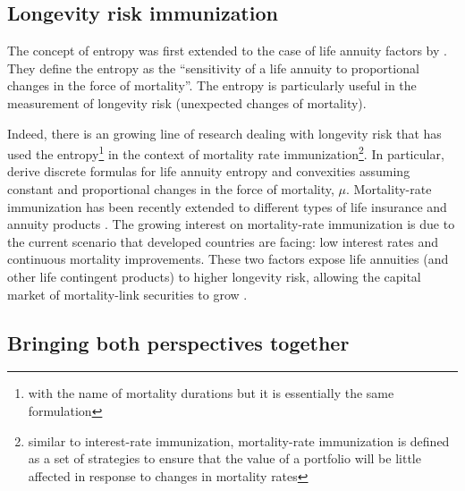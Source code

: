 \documentclass[12pt]{article}
\begin{document}
\subsection*{Longevity risk immunization}



The concept of entropy \citep{leser1955variations,demetrius1974demographic,keyfitz1977difference} was first extended to the case of life annuity factors by \citet{Haberman2011}. They define the entropy as the “sensitivity of a life annuity to proportional changes in the force of mortality”. The entropy is particularly useful in the measurement of longevity risk (unexpected changes of mortality).


Indeed, there is an growing line of research dealing with longevity risk that has used the entropy\footnote{with the name of mortality durations but it is essentially the same formulation} in the context of mortality rate immunization\footnote{similar to interest-rate immunization, mortality-rate immunization is defined as a set of strategies to ensure that the value of a portfolio will be little affected in response to changes in mortality rates}. In particular, \citet{wang2010optimal,tsai2011actuarial,Tsai2013a,Li2011} derive discrete formulas for life annuity entropy and convexities assuming constant and proportional changes in the force of mortality, $\mu$. Mortality-rate immunization has been recently extended to different types of life insurance and annuity products \citep{li2012key,Li2012,Wong2015,Luciano2015,levantesi2018natural}. The growing interest on mortality-rate immunization is due to the current scenario that developed countries are facing: low interest rates and continuous mortality improvements. These two factors expose life annuities (and other life contingent products) to higher longevity risk, allowing the capital market of mortality-link securities to grow \citep{blake2019still}.






\subsection*{Bringing both perspectives together}
\end{document}
